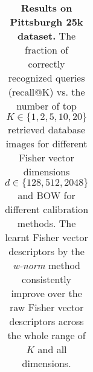 \begin{table}[t!]
\begin{centering}
\begin{tabularx}{0.89\linewidth}{|l|c c c c c|}
	\end{tabularx}
  \caption{ 
      \textbf{Results on Pittsburgh 25k dataset.} The fraction of correctly recognized queries (recall@K) vs. the number of top $K\in\{1,2,5,10,20\}$ retrieved database images for different Fisher vector dimensions $d\in\{128,512,2048\}$ and BOW for different calibration methods. The learnt Fisher vector descriptors by the  \emph{w-norm} method consistently improve over the raw Fisher vector descriptors across the whole range of $K$ and all dimensions.    
  }

\label{tab:recall01}
\end{centering}
\end{table}
